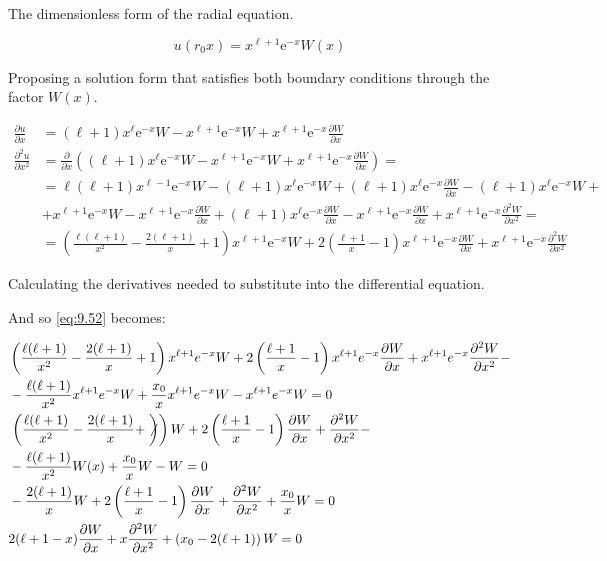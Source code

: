 \documentclass[italian]{HKNdocument}
\begin{document}
The dimensionless form of the radial equation.

\begin{equation}
u\left(r_{0} x\right)=x^{\ell+1} \mathrm{e}^{-x} W(x) \label{eq:9.53}
\end{equation}

Proposing a solution form that satisfies both boundary conditions through the factor $W(x)$.

\begin{align}
\frac{\partial u}{\partial x} & =(\ell+1) x^{\ell} \mathrm{e}^{-x} W-x^{\ell+1} \mathrm{e}^{-x} W+x^{\ell+1} \mathrm{e}^{-x} \frac{\partial W}{\partial x} \\
\frac{\partial^{2} u}{\partial x^{2}} & =\frac{\partial}{\partial x}\left((\ell+1) x^{\ell} \mathrm{e}^{-x} W-x^{\ell+1} \mathrm{e}^{-x} W+x^{\ell+1} \mathrm{e}^{-x} \frac{\partial W}{\partial x}\right)= \\
& =\ell(\ell+1) x^{\ell-1} \mathrm{e}^{-x} W-(\ell+1) x^{\ell} \mathrm{e}^{-x} W+(\ell+1) x^{\ell} \mathrm{e}^{-x} \frac{\partial W}{\partial x}-(\ell+1) x^{\ell} \mathrm{e}^{-x} W+ \\
& +x^{\ell+1} \mathrm{e}^{-x} W-x^{\ell+1} \mathrm{e}^{-x} \frac{\partial W}{\partial x}+(\ell+1) x^{\ell} \mathrm{e}^{-x} \frac{\partial W}{\partial x}-x^{\ell+1} \mathrm{e}^{-x} \frac{\partial W}{\partial x}+x^{\ell+1} \mathrm{e}^{-x} \frac{\partial^{2} W}{\partial x^{2}}= \\
& =\left(\frac{\ell(\ell+1)}{x^{2}}-\frac{2(\ell+1)}{x}+1\right) x^{\ell+1} \mathrm{e}^{-x} W+2\left(\frac{\ell+1}{x}-1\right) x^{\ell+1} \mathrm{e}^{-x} \frac{\partial W}{\partial x}+x^{\ell+1} \mathrm{e}^{-x} \frac{\partial^{2} W}{\partial x^{2}} \label{eq:9.54}
\end{align}

Calculating the derivatives needed to substitute into the differential equation.

And so \eqref{eq:9.52} becomes:

\begin{align}
& \left(\frac{\ell(\ell+1)}{x^{2}}-\frac{2(\ell+1)}{x}+1\right) x^{\ell+1} e^{-x} W+2\left(\frac{\ell+1}{x}-1\right) x^{\ell+1} e^{-x} \frac{\partial W}{\partial x}+x^{\ell+1} e^{-x} \frac{\partial^{2} W}{\partial x^{2}}- \\
& -\frac{\ell(\ell+1)}{x^{2}} x^{\ell+1} e^{-x} W+\frac{x_{0}}{x} x^{\ell+1} e^{-x} W-x^{\ell+1} e^{-x} W=0 \\
& \left.\left(\frac{\ell(\ell+1)}{x^{2}}-\frac{2(\ell+1)}{x}+\not\right)\right) W+2\left(\frac{\ell+1}{x}-1\right) \frac{\partial W}{\partial x}+\frac{\partial^{2} W}{\partial x^{2}}- \\
& -\frac{\ell(\ell+1)}{x^{2}} W(x)+\frac{x_{0}}{x} W- W = 0 \\
& -\frac{2(\ell+1)}{x} W+2\left(\frac{\ell+1}{x}-1\right) \frac{\partial W}{\partial x}+\frac{\partial^{2} W}{\partial x^{2}}+\frac{x_{0}}{x} W=0 \\
& 2(\ell+1-x) \frac{\partial W}{\partial x}+x \frac{\partial^{2} W}{\partial x^{2}}+\left(x_{0}-2(\ell+1)\right) W=0 \label{eq:9.55}
\end{align}
\end{document}
